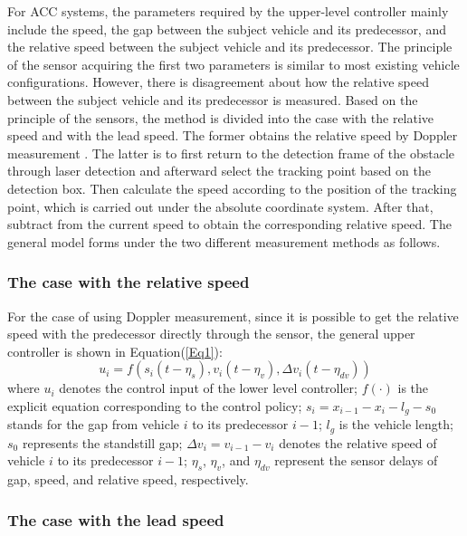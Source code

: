 \documentclass[journal]{IEEEtran}
\begin{document}
For ACC systems, the parameters required by the upper-level controller mainly include the speed, the gap between the subject vehicle and its predecessor, and the relative speed between the subject vehicle and its predecessor. The principle of the sensor acquiring the first two parameters is similar to most existing vehicle configurations. However, there is disagreement about how the relative speed between the subject vehicle and its predecessor is measured. Based on the principle of the sensors, the method is divided into the case with the relative speed and with the lead speed. The former obtains the relative speed by Doppler measurement \citep{pinson2016relative}. The latter is to first return to the detection frame of the obstacle through laser detection and afterward select the tracking point based on the detection box. Then calculate the speed according to the position of the tracking point, which is carried out under the absolute coordinate system. After that, subtract from the current speed to obtain the corresponding relative speed. The general model forms under the two different measurement methods as follows.

\subsubsection{The case with the relative speed}
\label{Section 2.2.1}

For the case of using Doppler measurement, since it is possible to get the relative speed with the predecessor directly through the sensor, the general upper controller is shown in Equation(\ref{Eq1}):
\begin{equation}
  u_i=f(s_i\left(t-\eta_s\right),v_i\left(t-\eta_v\right),\Delta v_i(t-\eta_{dv}))
  \label{Eq1}
\end{equation}
where $u_i$ denotes the control input of the lower level controller; $f(\cdot)$ is the explicit equation corresponding to the control policy; $s_i=x_{i-1}-x_i-l_g-s_0$ stands for the gap from vehicle $i$ to its predecessor $i-1$; $l_g$ is the vehicle length; $s_0$ represents the standstill gap; $\Delta v_i=v_{i-1}-v_i$ denotes the relative speed of vehicle $i$ to its predecessor $i-1$; $\eta_s$, $\eta_v$, and $\eta_{dv}$ represent the sensor delays of gap, speed, and relative speed, respectively.

\subsubsection{The case with the lead speed}
\label{Section 2.2.2}
\end{document}
